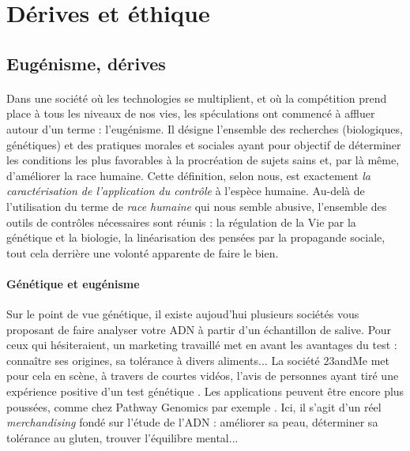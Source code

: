 \section{Dérives et éthique}

\subsection*{Eugénisme, dérives}

\paragraph{} Dans une société où les technologies se multiplient, et où la compétition prend place
à tous les niveaux de nos vies, les spéculations ont commencé à affluer autour d'un terme : l'eugénisme.
Il désigne l'ensemble des recherches (biologiques, génétiques) et des pratiques morales et sociales
ayant pour objectif de \guillemotleft déterminer les conditions les plus favorables à la procréation
de sujets sains et, par là même, d'améliorer la race humaine\guillemotright  \cite{Eugenisme0}. Cette
définition, selon nous, est exactement \emph{la caractérisation de l'application du contrôle} à l'espèce
humaine. Au-delà de l'utilisation du terme de \emph{race humaine} qui nous semble abusive, l'ensemble des
outils de contrôles nécessaires sont réunis : la régulation de la Vie par la génétique et la biologie, la
linéarisation des pensées par la propagande sociale, tout cela derrière une volonté apparente de faire le bien.

\paragraph{Génétique et eugénisme} Sur le point de vue génétique, il existe aujoud'hui plusieurs sociétés
vous proposant de faire analyser votre ADN à partir d'un échantillon de salive. Pour ceux qui hésiteraient,
un marketing travaillé met en avant les avantages du test : connaître ses origines, sa tolérance à divers
aliments... La société 23andMe met pour cela en scène, à travers de courtes vidéos, l'avis de personnes
ayant tiré une expérience positive d'un test génétique \cite{23andMe}. Les applications peuvent être 
encore plus poussées, comme chez Pathway Genomics par exemple \cite{Pathway0}. Ici, il s'agit d'un réel
\emph{merchandising} fondé sur l'étude de l'ADN : améliorer sa peau, déterminer sa tolérance au gluten, 
trouver l'équilibre mental...

